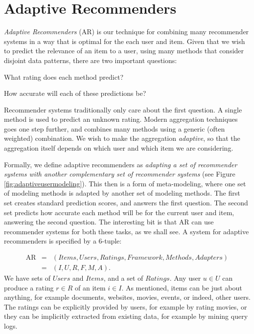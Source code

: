 \section{Adaptive Recommenders}
\label{sec:usermetamodeling}

\emph{Adaptive Recommenders} (AR) is our technique for combining many recommender systems
in a way that is optimal for the each user and item.
Given that we wish to predict the relevance of an item to a user,
using many methods that consider disjoint data patterns,
there are two important questions:

\begin{enumerate*}
  \item What rating does each method predict?
  \item How accurate will each of these predictions be?
\end{enumerate*}

Recommender systems traditionally only care about the first question.
A single method is used to predict an unknown rating.
Modern aggregation techniques goes one step further, and combines many methods using a generic (often weighted) combination.
We wish to make the aggregation \emph{adaptive},
so that the aggregation itself depends on which user and which item we are considering.

Formally, we define adaptive recommenders as \emph{adapting a set of recommender systems
with another complementary set of recommender systems} 
(see Figure \ref{fig:adaptiveusermodeling}).
This then is a form of meta-modeling, where one set of modeling methods is adapted by another set of modeling methods.
The first set creates standard prediction scores, and answers the first question.
The second set predicts how accurate each method will be for the current user and item,
answering the second question.
The interesting bit is that AR can use recommender systems for both these tasks, as we shall see.
A system for adaptive recommenders is specified by a 6-tuple:

\begin{eqnarray*}
  \mathrm{AR} &=& (Items, Users, Ratings, Framework, Methods, Adapters)\\
              &=& (I,U,R,F,M,A).
\end{eqnarray*}
%
We have sets of $Users$ and $Items$, and a set of $Ratings$.
Any user $u \in U$ can produce a rating $r \in R$ of an item $i \in I$.
As mentioned, items can be just about anything, for example documents, websites, movies, events, or indeed, other users.
The ratings can be explicitly provided by users, for example by rating movies,
or they can be implicitly extracted from existing data, for example by mining query logs.

